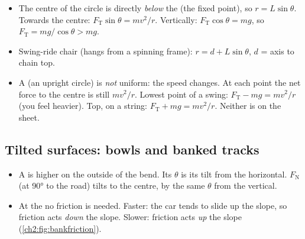 \begin{itemize}
  \item The centre of the circle is directly \emph{below} the  (the fixed point),
        so $r = L\sin\theta$. Towards the centre: $F_\mathrm{T}\sin\theta = mv^2/r$.
        Vertically: $F_\mathrm{T}\cos\theta = mg$, so $F_\mathrm{T} = mg/\cos\theta > mg$.
  \item Swing-ride chair (hangs from a spinning frame): $r = d + L\sin\theta$, $d$ = axis to chain top.
  \item A  (an upright circle) is \emph{not} uniform: the speed changes.
        At each point the net force to the centre is still $mv^2/r$. Lowest point of a swing:
        $F_\mathrm{T} - mg = mv^2/r$ (you feel heavier). Top, on a string:
        $F_\mathrm{T} + mg = mv^2/r$. Neither is on the sheet.
\end{itemize}

\subsection*{Tilted surfaces: bowls and banked tracks}
\begin{itemize}
  \item A  is higher on the outside of the bend. Its 
        $\theta$ is its tilt from the horizontal. $F_\mathrm{N}$ (at \ang{90} to the road)
        tilts to the centre, by the same $\theta$ from the vertical.
  \item At the  no friction is needed. Faster: the car tends to slide up
        the slope, so friction acts \emph{down} the slope. Slower: friction acts \emph{up}
        the slope (\cref{ch2:fig:bankfriction}).
\end{itemize}

